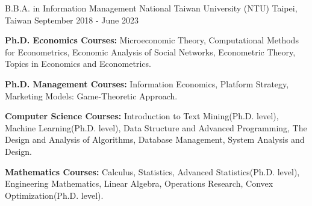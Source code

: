 

\begin{cventries}

  \cventry
  {B.B.A. in Information Management} %
    {National Taiwan University (NTU)} %
    {Taipei, Taiwan} %
    {September 2018 - June 2023} %
    {
      \begin{cvitems} %
        \item   \textbf{Ph.D. Economics Courses:}
                Microeconomic Theory,
                Computational Methods for Econometrics,
                Economic Analysis of Social Networks,
                Econometric Theory,
                Topics in Economics and Econometrics.
        \item   \textbf{Ph.D. Management Courses:}
                Information Economics, Platform Strategy,
                Marketing Models: Game-Theoretic Approach.
        \item   \textbf{Computer Science Courses:}
            Introduction to Text Mining(Ph.D. level),
            Machine Learning(Ph.D. level),
                Data Structure and Advanced Programming,
                The Design and Analysis of Algorithms,
                Database Management,
                System Analysis and Design.
        \item   \textbf{Mathematics Courses:}
                Calculus,
                Statistics, Advanced Statistics(Ph.D. level),
                Engineering Mathematics,
                Linear Algebra,
                Operations Research,
                Convex Optimization(Ph.D. level).
      \end{cvitems}
    }

\end{cventries}
